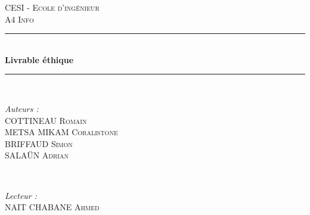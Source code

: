 \documentclass[10pt,a4paper]{article}
\begin{document}
\begin{titlepage}

\newcommand{\HRule}{\rule{\linewidth}{0.5mm}} %

\center %
 

\textsc{\LARGE CESI - Ecole d'ingénieur}\\[1.5cm] %
\textsc{\Large A4 Info}\\[0.5cm] %


\HRule \\[0.4cm]
{ \huge \bfseries Livrable éthique}\\[0.4cm] %
\HRule \\[1.5cm]
 

\begin{minipage}{0.4\textwidth}
\begin{flushleft} \large
\emph{Auteurs :}\\
COTTINEAU \textsc{Romain} \\
METSA MIKAM \textsc{Coralistone} \\
BRIFFAUD \textsc{Simon} \\
SALAÜN \textsc{Adrian} \\
\end{flushleft}
\end{minipage}
~
\begin{minipage}{0.4\textwidth}
\begin{flushright} \large
\emph{Lecteur :} \\
NAIT CHABANE \textsc{Ahmed} \\
\end{flushright}
\end{minipage}\\[2cm]


\end{titlepage}
\end{document}
